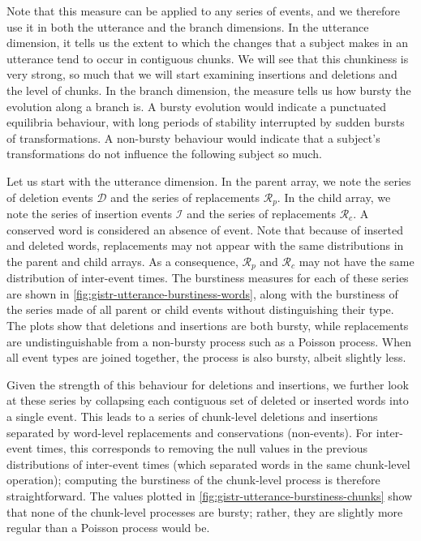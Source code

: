 Note that this measure can be applied to any series of events, and we
therefore use it in both the utterance and the branch dimensions. In the
utterance dimension, it tells us the extent to which the changes that a
subject makes in an utterance tend to occur in contiguous chunks. We
will see that this chunkiness is very strong, so much that we will start
examining insertions and deletions and the level of chunks. In the
branch dimension, the measure tells us how bursty the evolution along a
branch is. A bursty evolution would indicate a punctuated equilibria
behaviour, with long periods of stability interrupted by sudden bursts
of transformations. A non-bursty behaviour would indicate that a
subject's transformations do not influence the following subject so
much.

Let us start with the utterance dimension. In the parent array, we note
the series of deletion events \(\mathcal{D}\) and the series of
replacements \(\mathcal{R}_p\). In the child array, we note the series
of insertion events \(\mathcal{I}\) and the series of replacements
\(\mathcal{R}_c\). A conserved word is considered an absence of event.
Note that because of inserted and deleted words, replacements may not
appear with the same distributions in the parent and child arrays. As a
consequence, \(\mathcal{R}_p\) and \(\mathcal{R}_c\) may not have the
same distribution of inter-event times. The burstiness measures for each
of these series are shown in
\cref{fig:gistr-utterance-burstiness-words}, along with the burstiness
of the series made of all parent or child events without distinguishing
their type. The plots show that deletions and insertions are both
bursty, while replacements are undistinguishable from a non-bursty
process such as a Poisson process. When all event types are joined
together, the process is also bursty, albeit slightly less.

Given the strength of this behaviour for deletions and insertions, we
further look at these series by collapsing each contiguous set of
deleted or inserted words into a single event. This leads to a series of
chunk-level deletions and insertions separated by word-level
replacements and conservations (non-events). For inter-event times, this
corresponds to removing the null values in the previous distributions of
inter-event times (which separated words in the same chunk-level
operation); computing the burstiness of the chunk-level process is
therefore straightforward. The values plotted in
\cref{fig:gistr-utterance-burstiness-chunks} show that none of the
chunk-level processes are bursty; rather, they are slightly more regular
than a Poisson process would be.

